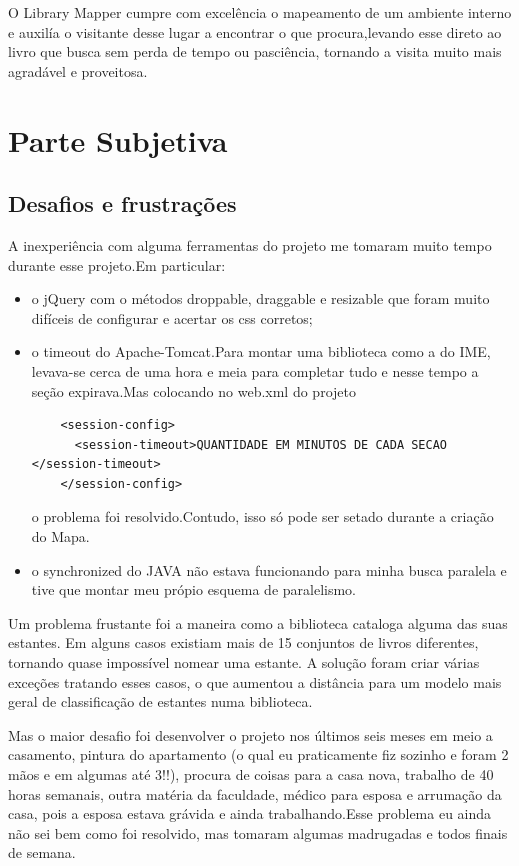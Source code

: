 \documentclass[a4paper,10pt]{article}
\begin{document}
	O Library Mapper cumpre com excelência o mapeamento de um ambiente interno e auxilía  o visitante desse lugar a encontrar o que 
	procura,levando esse direto ao livro que busca sem perda de tempo ou pasciência, tornando a visita muito mais agradável e proveitosa.
	
   	\newpage
  \section{Parte Subjetiva}
  \subsection{Desafios e frustrações}
	A inexperiência com alguma ferramentas do projeto me tomaram muito tempo durante esse projeto.Em particular:
	\begin{itemize}	
		\item{ 	o jQuery com o métodos droppable, draggable e resizable que foram muito difíceis de configurar e acertar os css
	corretos; }
		\item{ o timeout do Apache-Tomcat.Para montar uma biblioteca como a do IME, levava-se cerca de uma hora e meia para completar tudo
	e nesse tempo a seção expirava.Mas colocando no web.xml do projeto 
\begin{lstlisting}	
    <session-config>  
      <session-timeout>QUANTIDADE EM MINUTOS DE CADA SECAO </session-timeout>  
    </session-config>   
\end{lstlisting}	o problema foi resolvido.Contudo, isso só pode ser setado durante a criação do Mapa.}
		\item{ o synchronized do JAVA não estava funcionando para minha busca paralela e tive que montar meu própio esquema de paralelismo.}\\
	\end{itemize}	

	Um problema frustante foi a maneira como a biblioteca cataloga alguma das suas estantes. Em alguns casos existiam mais de 15 conjuntos
	de livros diferentes, tornando quase impossível nomear uma estante. A solução foram criar várias exceções tratando esses casos, o que 
	aumentou a distância para um modelo mais geral de classificação de estantes numa biblioteca.

	Mas o maior desafio foi desenvolver o projeto nos últimos seis meses em meio a casamento, pintura do apartamento (o qual eu praticamente
	fiz sozinho e foram 2 mãos e em algumas até 3!!), procura de coisas para a casa nova, trabalho de 40 horas semanais, outra matéria da faculdade,
	médico para esposa e arrumação da casa, pois a esposa estava grávida e ainda trabalhando.Esse problema eu ainda não sei bem como foi resolvido,
	mas tomaram algumas madrugadas e todos finais de semana.\\
\end{document}
